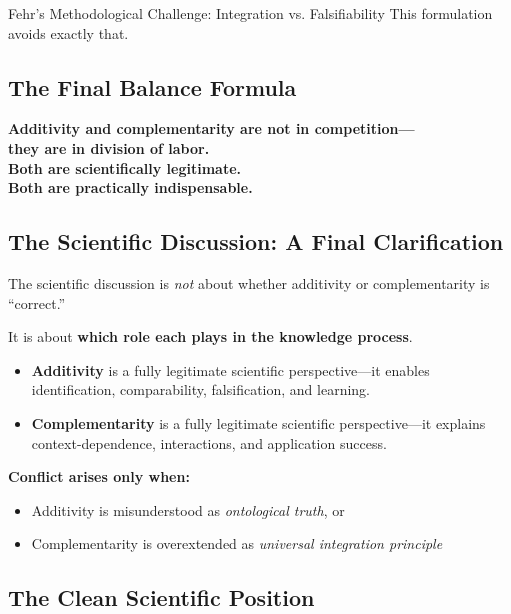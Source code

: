\begin{chapter}{Fehr's Methodological Challenge: Integration vs. Falsifiability}
This formulation avoids exactly that.

\subsection{The Final Balance Formula}

\begin{tcolorbox}[colback=blue!10!white,colframe=blue!75!black,title=\textbf{The Definitive Statement}]
\begin{center}
\large
\textbf{Additivity and complementarity are not in competition---\\
they are in division of labor.}\\[0.5em]
\textbf{Both are scientifically legitimate.}\\
\textbf{Both are practically indispensable.}
\end{center}
\end{tcolorbox}

\subsection{The Scientific Discussion: A Final Clarification}

The scientific discussion is \textit{not} about whether additivity or complementarity is ``correct.''

It is about \textbf{which role each plays in the knowledge process}.

\begin{itemize}[noitemsep]
    \item \textbf{Additivity} is a fully legitimate scientific perspective---it enables identification, comparability, falsification, and learning.
    \item \textbf{Complementarity} is a fully legitimate scientific perspective---it explains context-dependence, interactions, and application success.
\end{itemize}

\textbf{Conflict arises only when:}
\begin{itemize}[noitemsep]
    \item Additivity is misunderstood as \textit{ontological truth}, or
    \item Complementarity is overextended as \textit{universal integration principle}
\end{itemize}

\subsection{The Clean Scientific Position}


\end{chapter}

